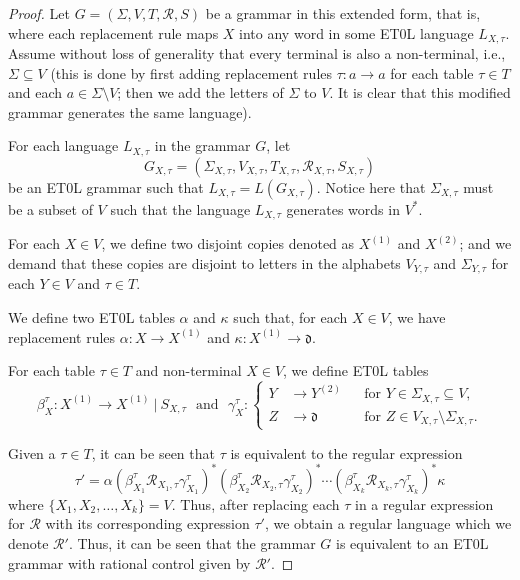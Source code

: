 \begin{proof}
	
	Let $G = (\Sigma, V, T, \mathcal{R}, S)$ be a grammar in this extended form, that is, where each replacement rule maps $X$ into any word in some ET0L language $L_{X,\tau}$. 
	Assume without loss of generality that every terminal is also a non-terminal, i.e., $\Sigma \subseteq V$
	(this is done by  first adding replacement rules $\tau \colon a \to a$ for each table $\tau \in T$ and each $a \in \Sigma \setminus V$; then we add the letters of $\Sigma$ to $V$.
	It is clear that this modified grammar generates the same language).
	
	
	For each language $L_{X,\tau}$ in the grammar $G$, let
	\[
	G_{X,\tau}
	=
	(
	\Sigma_{X,\tau},
	V_{X,\tau},
	T_{X,\tau},
	\mathcal{R}_{X,\tau},
	S_{X,\tau}
	)
	\]
	be an ET0L grammar such that $L_{X,\tau} = L(G_{X,\tau})$.
	Notice here that $\Sigma_{X,\tau}$ must be a subset of $V$ such that the language $L_{X,\tau}$ generates words in $V^*$.
	
	For each $X \in V$, we define two disjoint copies denoted as $X^{(1)}$ and $X^{(2)}$;
	and we demand that these copies are disjoint to letters in the alphabets $V_{Y,\tau}$ and $\Sigma_{Y,\tau}$ for each $Y\in V$ and $\tau \in T$.
	
	We define two ET0L tables $\alpha$ and $\kappa$ such that, for each $X \in V$, we have replacement rules $\alpha \colon X \to X^{(1)}$ and $\kappa\colon X^{(1)} \to \mathfrak{d}$.
	
	For each table $\tau \in T$ and non-terminal $X \in V$, we define ET0L tables
	\[
	\beta_{X}^\tau\colon X^{(1)} \to X^{(1)}\ \vert \ S_{X,\tau}
	\ \ \ 
	\text{and}
	\ \ \ 
	\gamma_{X}^\tau\colon
	\left\{
	\begin{aligned}
		Y &\to Y^{(2)}     && \text{for }Y \in \Sigma_{X,\tau}\subseteq V,\\
		Z &\to \mathfrak{d}&& \text{for }Z \in V_{X,\tau} \setminus \Sigma_{X,\tau}.
	\end{aligned}
	\right.
	\]
	
	Given a $\tau \in T$, it can be seen that $\tau$ is equivalent to the regular expression
	\[
	\tau'
	=
	\alpha
	\left( \beta_{X_1}^\tau \mathcal{R}_{X_1,\tau} \gamma_{X_1}^\tau\right)^*
	\left( \beta_{X_2}^\tau \mathcal{R}_{X_2,\tau} \gamma_{X_2}^\tau\right)^*
	\cdots
	\left( \beta_{X_k}^\tau \mathcal{R}_{X_k,\tau} \gamma_{X_k}^\tau\right)^*
	\kappa
	\]
	where $\{X_1,X_2,\ldots,X_k\}=V$.
	Thus, after replacing each $\tau$ in a regular expression for $\mathcal{R}$ with its corresponding expression $\tau'$, we obtain a regular language which we denote $\mathcal{R}'$.
	Thus, it can be seen that the grammar $G$ is equivalent to an ET0L grammar with rational control given by $\mathcal{R}'$.
\end{proof}

